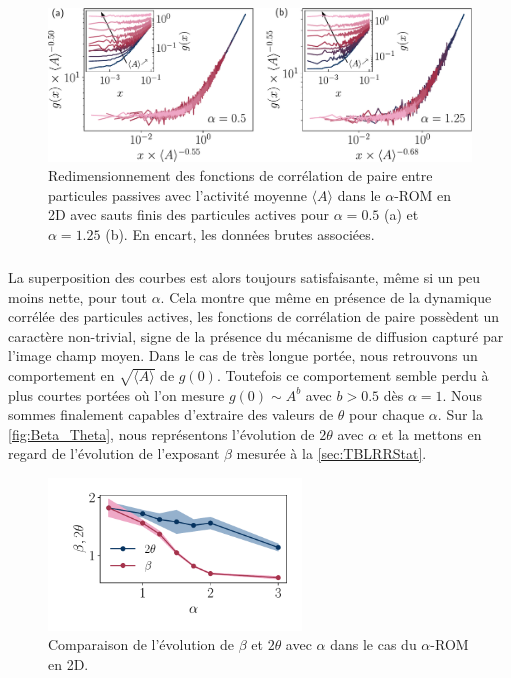 \begin{figure}[h]
	\centering
	\includegraphics[width=\textwidth]{Chapitre3/Figures/Interpretation/PCorr_alpha.pdf}
	\caption{Redimensionnement des fonctions de corrélation de paire entre particules passives avec l'activité moyenne $\langle A \rangle$ dans le $\alpha$-ROM en 2D avec sauts finis des particules actives pour $\alpha = 0.5$ (a) et $\alpha=1.25$ (b). En encart, les données brutes associées.}
	\label{fig:PCorr_alpha}
\end{figure}

\subparagraph{}La superposition des courbes est alors toujours satisfaisante, même si un peu moins nette, pour tout $\alpha$. Cela montre que même en présence de la dynamique corrélée des particules actives, les fonctions de corrélation de paire possèdent un caractère non-trivial, signe de la présence du mécanisme de diffusion capturé par l'image champ moyen. Dans le cas de très longue portée, nous retrouvons un comportement en $\sqrt{\langle A \rangle}$ de $g(0)$. Toutefois ce comportement semble perdu à plus courtes portées où l'on mesure $g(0)\sim A^b$ avec $b>0.5$ dès $\alpha = 1$. Nous sommes finalement capables d'extraire des valeurs de $\theta$ pour chaque $\alpha$. Sur la \autoref{fig:Beta_Theta}, nous représentons l'évolution de $2\theta$ avec $\alpha$ et la mettons en regard de l'évolution de l'exposant $\beta$ mesurée à la \autoref{sec:TBLRRStat}.

\begin{figure}[h]
	\centering
	\includegraphics[width=0.6\textwidth]{Chapitre3/Figures/Interpretation/Beta_Theta.pdf}
	\caption{Comparaison de l'évolution de $\beta$ et $2\theta$ avec $\alpha$ dans le cas du $\alpha$-ROM en 2D.}
	\label{fig:Beta_Theta}
\end{figure}

